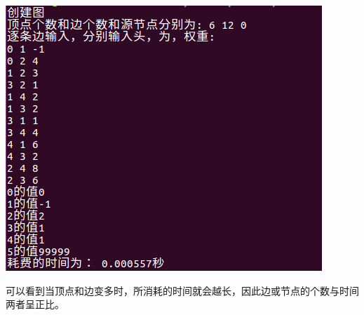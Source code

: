 \documentclass{ctexart}
\begin{document}
\begin{center}
  \includegraphics[scale=0.5]{ss8.png}
  \hspace{0.1in}
\end{center}
可以看到当顶点和边变多时，所消耗的时间就会越长，因此边或节点的个数与时间两者呈正比。
\end{document}
